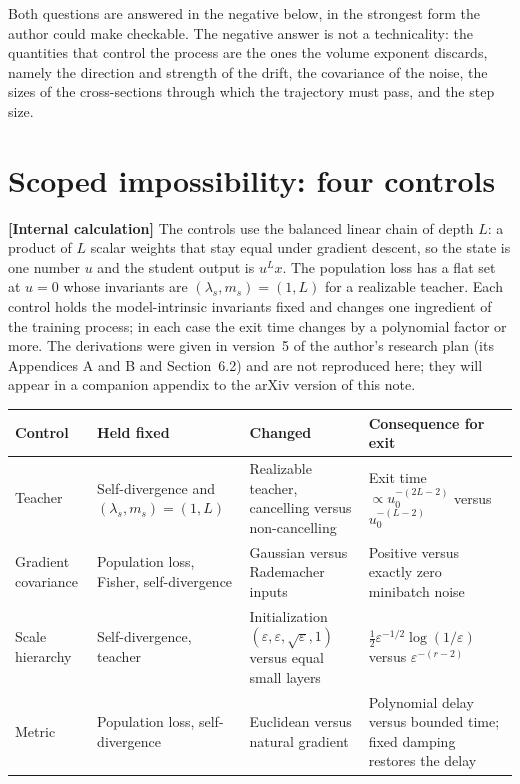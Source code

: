 \documentclass[11pt,a4paper]{article}
\newcommand{\eps}{\varepsilon}
\newcommand{\evl}[2]{{\small\bfseries\color{#1}[#2]}}
\newcommand{\LCalc}{\evl{ccalc}{Internal calculation}}
\begin{document}
Both questions are answered in the negative below, in the strongest form
the author could make checkable. The negative answer is not a technicality:
the quantities that control the process are the ones the volume exponent
discards, namely the direction and strength of the drift, the covariance of
the noise, the sizes of the cross-sections through which the trajectory
must pass, and the step size.

\section{Scoped impossibility: four controls}
\label{sec:impossibility}

\LCalc{} The controls use the balanced linear chain of depth $L$: a product
of $L$ scalar weights that stay equal under gradient descent, so the state is
one number $u$ and the student output is $u^Lx$. The population loss has a
flat set at $u=0$ whose invariants are $(\lambda_s,m_s)=(1,L)$ for a
realizable teacher. Each control holds the model-intrinsic invariants fixed
and changes one ingredient of the training process; in each case the exit
time changes by a polynomial factor or more. The derivations were given in
version~5 of the author's research plan (its Appendices A and B and
Section~6.2) and are not reproduced here; they will appear in a companion
appendix to the arXiv version of this note.

\begin{center}
\small
\begin{tabular}{@{}p{2.1cm}p{3.6cm}p{3.5cm}p{4.9cm}@{}}
\toprule
Control & Held fixed & Changed & Consequence for exit \\
\midrule
Teacher & Self-divergence and $(\lambda_s,m_s)=(1,L)$ & Realizable
teacher, cancelling versus non-cancelling & Exit time
$\propto u_0^{-(2L-2)}$ versus $u_0^{-(L-2)}$ \\ \addlinespace
Gradient covariance & Population loss, Fisher, self-divergence &
Gaussian versus Rademacher inputs & Positive versus exactly zero
minibatch noise \\ \addlinespace
Scale hierarchy & Self-divergence, teacher & Initialization
$(\eps,\eps,\sqrt\eps,1)$ versus equal small layers &
$\tfrac12\eps^{-1/2}\log(1/\eps)$ versus $\eps^{-(r-2)}$ \\ \addlinespace
Metric & Population loss, self-divergence & Euclidean versus natural
gradient & Polynomial delay versus bounded time; fixed damping restores
the delay \\
\bottomrule
\end{tabular}
\end{center}
\end{document}
